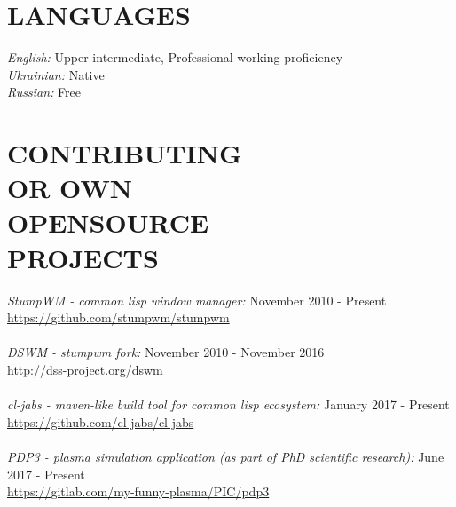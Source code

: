 \documentclass[mymargin,10pt]{res} %
\begin{document}
\begin{resume}

\section{LANGUAGES}

{\sl English:} Upper-intermediate, Professional working proficiency \\
{\sl Ukrainian:} Native \\
{\sl Russian:} Free \\


\section{CONTRIBUTING \\ OR OWN \\ OPENSOURCE \\ PROJECTS}

{\sl StumpWM - common lisp window manager:} \hfill November 2010 - Present \\ \url{https://github.com/stumpwm/stumpwm} \\ \\
{\sl DSWM - stumpwm fork:} \hfill November 2010 - November 2016 \\ \url{http://dss-project.org/dswm} \\ \\
{\sl cl-jabs - maven-like build tool for common lisp ecosystem:} \hfill January 2017 - Present \\ \url{https://github.com/cl-jabs/cl-jabs} \\ \\
{\sl PDP3 - plasma simulation application (as part of PhD scientific research):} \hfill June 2017 - Present \\ \url{https://gitlab.com/my-funny-plasma/PIC/pdp3} \\ \\



\end{resume}
\end{document}
